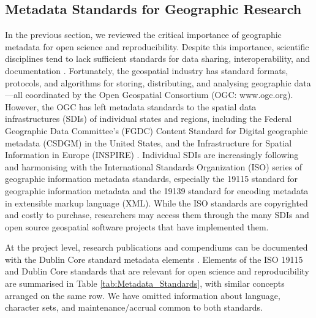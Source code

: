 \documentclass{isprs} %
\begin{document}
\subsection{Metadata Standards for Geographic Research}\label{sec:Metadata}

In the previous section, we reviewed the critical importance of geographic metadata for open science and reproducibility.
Despite this importance, scientific disciplines tend to lack sufficient standards for data sharing, interoperability, and documentation \citep{NASEM2019}.
Fortunately, the geospatial industry has standard formats, protocols, and algorithms for storing, distributing, and analysing geographic data---all coordinated by the Open Geospatial Consortium (OGC: www.ogc.org).
However, the OGC has left metadata standards to the spatial data infrastructures (SDIs) of individual states and regions, including the Federal Geographic Data Committee's (FGDC) Content Standard for Digital geographic metadata (CSDGM) in the United States, and the Infrastructure for Spatial Information in Europe (INSPIRE) \citep{Kim1999,Bartha2011}.
Individual SDIs are increasingly following and harmonising with the International Standards Organization (ISO) series of geographic information metadata standards, especially the 19115 standard \citep{ISO2014} for geographic information metadata and the 19139 standard \citep{ISO2019} for encoding metadata in extensible markup language (XML).
While the ISO standards are copyrighted and costly to purchase, researchers may access them through the many SDIs and open source geospatial software projects that have implemented them.

At the project level, research publications and compendiums can be documented with the Dublin Core\texttrademark{}  standard metadata elements \citep{DCMI2005}. Elements of the ISO 19115 and Dublin Core standards that are relevant for open science and reproducibility are summarised in Table \ref{tab:Metadata_Standards}, with similar concepts arranged on the same row. We have omitted information about language, character sets, and maintenance/accrual common to both standards.
\end{document}
